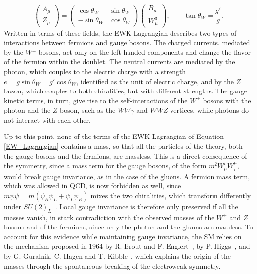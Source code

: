 \begin{equation}
    \begin{pmatrix} A_\mu \\ Z_\mu \end{pmatrix} = \begin{pmatrix} \cos\theta_W & \sin\theta_W \\ -\sin\theta_W & \cos\theta_W \end{pmatrix} \begin{pmatrix} B_\mu \\ W^3_\mu \end{pmatrix}, \qquad \tan\theta_W = \frac{g'}{g}.
    \label{eq:weinberg_mixing}
\end{equation}
%
Written in terms of these fields, the EWK Lagrangian describes two types of interactions between fermions and gauge bosons. The charged currents, mediated by the $W^\pm$ bosons, act only on the left-handed components and change the flavor of the fermion within the doublet. The neutral currents are mediated by the photon, which couples to the electric charge with a strength $e = g\sin\theta_W = g'\cos\theta_W$, identified as the unit of electric charge, and by the $Z$ boson, which couples to both chiralities, but with different strengths. The gauge kinetic terms, in turn, give rise to the self-interactions of the $W^\pm$ bosons with the photon and the $Z$ boson, such as the $WW\gamma$ and $WWZ$ vertices, while photons do not interact with each other.\medskip




Up to this point, none of the terms of the EWK Lagrangian of Equation \ref{EW_Lagrangian} contains a mass, so that all the particles of the theory, both the gauge bosons and the fermions, are massless. This is a direct consequence of the symmetry, since a mass term for the gauge bosons, of the form $m^2 W^i_\mu W_i^\mu$, would break gauge invariance, as in the case of the gluons. A fermion mass term, which was allowed in QCD, is now forbidden as well, since $m\bar{\psi}\psi = m(\bar{\psi}_R\psi_L+\bar{\psi}_L\psi_R)$ mixes the two chiralities, which transform differently under $SU(2)_L$~\cite{Herrero:1998eq}. Local gauge invariance is therefore only preserved if all the masses vanish, in stark contradiction with the observed masses of the $W^\pm$ and $Z$ bosons and of the fermions, since only the photon and the gluons are massless. To account for this evidence while maintaining gauge invariance, the SM relies on the mechanism proposed in 1964 by R. Brout and F. Englert~\cite{Englert:1964et}, by P. Higgs~\cite{Higgs:1964ia,Higgs:1964pj}, and by G. Guralnik, C. Hagen and T. Kibble~\cite{Guralnik:1964eu}, which explains the origin of the masses through the spontaneous breaking of the electroweak symmetry.



